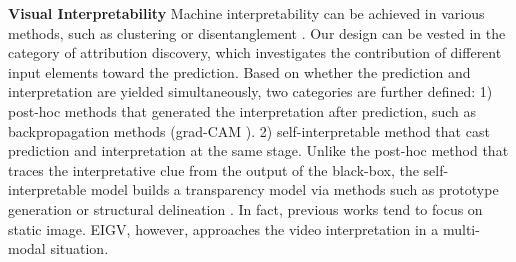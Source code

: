 \vspace{5pt}
\noindent\textbf{Visual Interpretability}
Machine interpretability can be achieved in various methods, such as clustering \cite{monnier2020dticlustering} or disentanglement \cite{shen2020interfacegan}. Our design can be vested in the category of attribution discovery, which investigates the contribution of different input elements toward the prediction. 
Based on whether the prediction and interpretation are yielded simultaneously, two categories are further defined: 1) post-hoc methods that generated the interpretation after prediction, such as backpropagation methods (\eg grad-CAM \cite{DBLP:conf/iccv/SelvarajuCDVPB17}). 2) self-interpretable method that cast prediction and interpretation at the same stage.
%
Unlike the post-hoc method that traces the interpretative clue from the output of the black-box, the self-interpretable model builds a transparency model via methods such as prototype generation \cite{DBLP:journals/corr/abs-1806-10574} or structural delineation \cite{wu2022dir}. 
%
In fact, previous works tend to focus on static image. EIGV, however, approaches the video interpretation in a multi-modal situation. 

\vspace{-5pt}